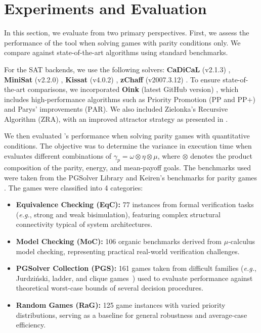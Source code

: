 \documentclass[runningheads]{llncs}
\begin{document}

\section{Experiments and Evaluation}\label{sec:experiments}

In this section, we evaluate \nocq from two primary perspectives. First, we assess the performance of the tool when solving games with parity conditions only. We compare \nocq against state-of-the-art algorithms using standard benchmarks. 

For the SAT backends, we use the following solvers: \textbf{CaDiCaL} (v2.1.3) \cite{Biere:Cadical:2024}, \textbf{MiniSat} (v2.2.0) \cite{Een:MiniSat:2003}, \textbf{Kissat} (v4.0.2) \cite{Biere:Kissat:2024}, \textbf{zChaff} (v2007.3.12) \cite{Moskewicz:zChaff:2001}.
%
To ensure state-of-the-art comparisons, we incorporated \textbf{Oink} (latest GitHub version) \cite{vanDijk:2018}, which includes high-performance algorithms such as Priority Promotion ($\text{PP}$ and $\text{PP+}$) and Parys' improvements ($\text{PAR}$). We also included Zielonka's Recursive Algorithm ($\text{ZRA}$), with an improved attractor strategy as presented in \cite{Aggarwal:2023}.

We then evaluated \nocq's performance when solving parity games with quantitative conditions. The objective was to determine the variance in execution time when \nocq evaluates different combinations of $\gamma_{p} = \omega \otimes \eta \otimes \mu$, where $\otimes$ denotes the product composition of the parity, energy, and mean-payoff goals.
%
The benchmarks used were taken from the PGSolver Library \cite{Friedmann:2017} and Keiren's benchmarks for parity games \cite{Keiren:2015}. The games were classified into 4 categories:

\begin{itemize}
\item \textbf{Equivalence Checking (EqC):} 77 instances from formal verification tasks ({\em e.g.}, strong and weak bisimulation), featuring complex structural connectivity typical of system architectures.
\item \textbf{Model Checking (MoC):} 106 organic benchmarks derived from $\mu$-calculus model checking, representing practical real-world verification challenges.
\item \textbf{PGSolver Collection (PGS):} 161 games taken from difficult families ({\em e.g.}, Jurdziński, ladder, and clique games~\cite{Benerecetti:2016}) used to evaluate performance against theoretical worst-case bounds of several decision procedures.
\item \textbf{Random Games (RaG):} 125 game instances with varied priority distributions, serving as a baseline for general robustness and average-case efficiency.
\end{itemize}
\end{document}
